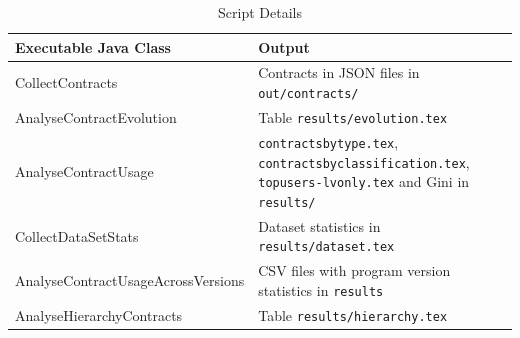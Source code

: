 \documentclass[a4paper,UKenglish]{darts}
\begin{document}
\begin{scope}
  
  \begin{table}[t]
  	\centering
  	\caption{Script Details}
  	\label{tab:scripts}
  	\begin{tabular}{p{6cm} p{8cm} } \hline
  		Executable Java Class & Output \\ \hline
  		CollectContracts & Contracts in JSON files in \texttt{out/contracts/}   \\
  		AnalyseContractEvolution & Table \texttt{results/evolution.tex}	 \\
  		AnalyseContractUsage & \texttt{contractsbytype.tex}, \texttt{contractsbyclassification.tex}, \texttt{topusers-lvonly.tex} and Gini in \texttt{results/} \\
  		CollectDataSetStats & Dataset statistics in \texttt{results/dataset.tex}   \\
  		AnalyseContractUsageAcrossVersions & CSV files with program version statistics in \texttt{results} \\
  		AnalyseHierarchyContracts & Table \texttt{results/hierarchy.tex} \\
  		\hline
  	\end{tabular}
  \end{table}
  
  
  


   	
\end{scope}
\end{document}
